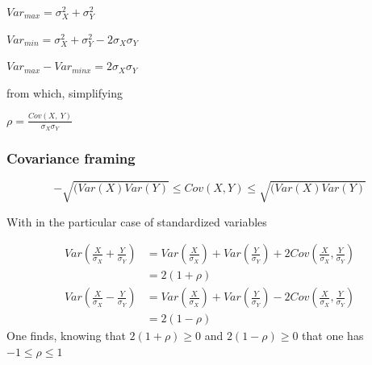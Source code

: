 \documentclass[
]{report}
\begin{document}
\(Var_{max} = \sigma_X^2+\sigma_Y^2\)

\(Var_{min} = \sigma_X^2+\sigma_Y^2-2\sigma_X\sigma_Y\)

\(Var_{max}-Var_{minx} = 2\sigma_X\sigma_Y\)

from which, simplifying

\(\rho = \frac{Cov(X,~Y)}{\sigma_X\sigma_Y}\)

\hypertarget{covariance-framing}{%
\subsubsection{Covariance framing}\label{covariance-framing}}

\[-\sqrt{(Var(X)Var(Y)} \leq Cov(X,Y) \leq \sqrt{(Var(X)Var(Y)}\]

With in the particular case of standardized variables

\begin{align*}
Var(\frac{X}{\sigma_X}+\frac{Y}{\sigma_Y})&= Var(\frac{X}{\sigma_X})+Var(\frac{Y}{\sigma_Y})+2Cov(\frac{X}{\sigma_X},\frac{Y}{\sigma_Y})\\
&=2(1+\rho)\\
Var(\frac{X}{\sigma_X}-\frac{Y}{\sigma_Y})&= Var(\frac{X}{\sigma_X})+Var(\frac{Y}{\sigma_Y})-2Cov(\frac{X}{\sigma_X},\frac{Y}{\sigma_Y})\\
&=2(1-\rho)
\end{align*}
One finds, knowing that \(2(1+\rho) \geq 0\) and \(2(1-\rho)\geq 0\) that one has \(-1 \le \rho \le 1\)

  
\end{document}

